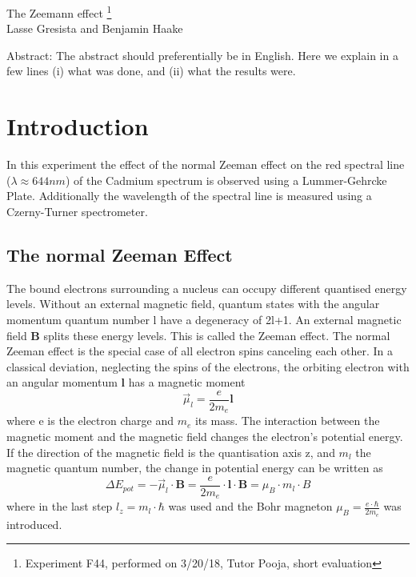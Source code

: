 \documentclass[12pt]{article}
\begin{document}
\thispagestyle{empty}     %
\null
\vspace{40mm}
\begin{center}
{%
\Large  The Zeemann effect
\footnote{\noindent Experiment F44, performed on 3/20/18, Tutor Pooja, short evaluation}}\\[15mm]
Lasse Gresista and Benjamin Haake

\vspace{25mm}

\parbox{0.9\textwidth}{   %
Abstract:    
\small The abstract should preferentially be in English. Here we explain in a
few lines (i) what was done, and (ii) what the results were.
}
\end{center}

\vfill
\vspace{20mm}


\newpage
{}

\section{Introduction}
In this experiment the effect of the normal Zeeman effect on the red spectral line ($\lambda\approx644nm$) of the Cadmium spectrum is observed using a Lummer-Gehrcke Plate. Additionally the wavelength of the spectral line is measured using a Czerny-Turner spectrometer.

\subsection{The normal Zeeman Effect}
The bound electrons surrounding a nucleus can occupy different quantised energy levels. Without an external magnetic field, quantum states with the angular momentum quantum number l have a degeneracy of 2l+1. An external magnetic field \textbf{B} splits these energy levels. This is called the Zeeman effect. The normal Zeeman effect is the special case of all electron spins canceling each other. In a classical deviation, neglecting the spins of the electrons, the orbiting electron with an angular momentum \textbf{l} has a magnetic moment
\begin{equation}
\vec{\mu}_l=\frac{e}{2m_e}\textbf{l}
\end{equation}
where e is the electron charge and $m_e$ its mass. The interaction between the magnetic moment and the magnetic field changes the electron's potential energy. If the direction of the magnetic field is the quantisation axis z, and $m_l$ the magnetic quantum number, the change in potential energy can be written as
\begin{equation}
\Delta E_{pot}=-\vec{\mu}_l\cdot \textbf{B}=\frac{e}{2m_e}\cdot\textbf{l}\cdot\textbf{B}=\mu_B \cdot m_l \cdot B
\end{equation}
where in the last step $l_z=m_l\cdot\hbar$ was used and the Bohr magneton $\mu_B=\frac{e\cdot\hbar}{2m_e}$ was introduced.
\end{document}
